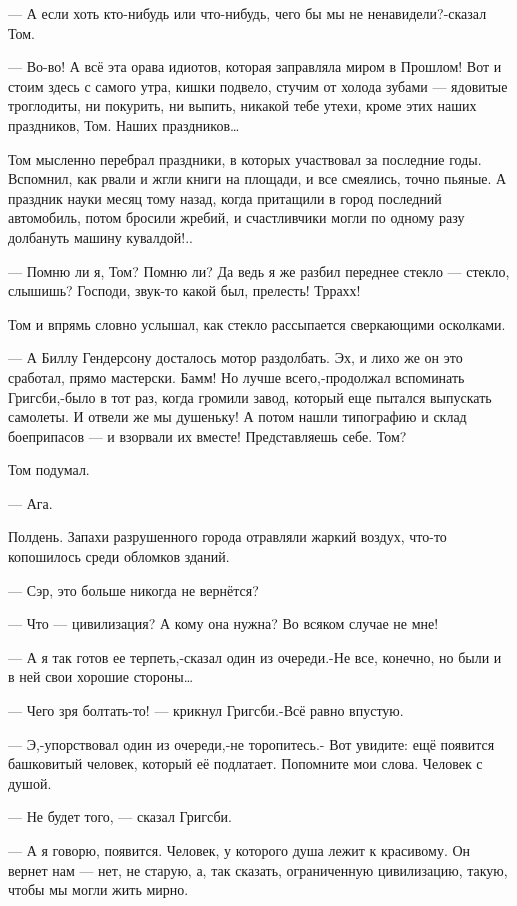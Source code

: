 — А если хоть кто-нибудь или что-нибудь, чего бы мы не ненавидели?-сказал Том.

— Во-во! А всё эта орава идиотов, которая заправляла миром в Прошлом! Вот и
стоим здесь с самого утра, кишки подвело, стучим от холода зубами — ядовитые
троглодиты, ни покурить, ни выпить, никакой тебе утехи, кроме этих наших
праздников, Том. Наших праздников…

Том мысленно перебрал праздники, в которых участвовал за последние годы.
Вспомнил, как рвали и жгли книги на площади, и все смеялись, точно пьяные. А
праздник науки месяц тому назад, когда притащили в город последний автомобиль,
потом бросили жребий, и счастливчики могли по одному разу долбануть машину
кувалдой!..

— Помню ли я, Том? Помню ли? Да ведь я же разбил переднее стекло — стекло,
слышишь? Господи, звук-то какой был, прелесть! Тррахх!

Том и впрямь словно услышал, как стекло рассыпается сверкающими осколками.

— А Биллу Гендерсону досталось мотор раздолбать. Эх, и лихо же он это сработал,
прямо мастерски. Бамм! Но лучше всего,-продолжал вспоминать Григсби,-было в тот
раз, когда громили завод, который еще пытался выпускать самолеты. И отвели же
мы душеньку! А потом нашли типографию и склад боеприпасов — и взорвали их
вместе! Представляешь себе. Том?

Том подумал.

— Ага.

Полдень. Запахи разрушенного города отравляли жаркий воздух, что-то копошилось
среди обломков зданий.

— Сэр, это больше никогда не вернётся?

— Что — цивилизация? А кому она нужна? Во всяком случае не мне!

— А я так готов ее терпеть,-сказал один из очереди.-Не все, конечно, но были и
в ней свои хорошие стороны…

— Чего зря болтать-то! — крикнул Григсби.-Всё равно впустую.

— Э,-упорствовал один из очереди,-не торопитесь.- Вот увидите: ещё появится
башковитый человек, который её подлатает. Попомните мои слова. Человек с душой.

— Не будет того, — сказал Григсби.

— А я говорю, появится. Человек, у которого душа лежит к красивому. Он вернет
нам — нет, не старую, а, так сказать, ограниченную цивилизацию, такую, чтобы мы
могли жить мирно.

